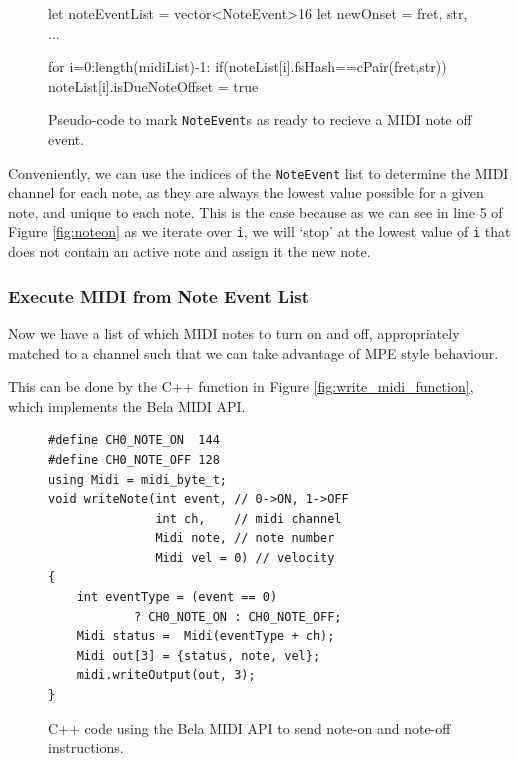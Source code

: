 \begin{figure}[h]
\begin{mdframed}
\begin{verbnobox}[\small]
let noteEventList = vector<NoteEvent>{16}
let newOnset = {fret, str, ...}

for i=0:length(midiList)-1:
{
    if(noteList[i].fsHash==cPair(fret,str))
    {
         noteList[i].isDueNoteOffset = true
    }
}
\end{verbnobox}
    \end{mdframed}
        \caption{Pseudo-code to mark \texttt{NoteEvent}s as ready to recieve a MIDI note off event.}
    \label{fig:noteoff}
\end{figure}

Conveniently, we can use the indices of the \texttt{NoteEvent} list to determine the MIDI channel for each note, as they are always the lowest value possible for a given note, and unique to each note. This is the case because as we can see in line 5 of Figure \ref{fig:noteon} as we iterate over \texttt{i}, we will `stop' at the lowest value of \texttt{i} that does not contain an active note and assign it the new note. 

\subsubsection{Execute MIDI from Note Event List}
Now we have a list of which MIDI notes to turn on and off, appropriately matched to a channel such that we can take advantage of MPE style behaviour.

This can be done by the C++ function in Figure \ref{fig:write_midi_function}, which implements the Bela MIDI API.

\begin{figure}[h]
\begin{mdframed}
\begin{lstlisting}
#define CH0_NOTE_ON  144
#define CH0_NOTE_OFF 128
using Midi = midi_byte_t;
void writeNote(int event, // 0->ON, 1->OFF
               int ch,    // midi channel
               Midi note, // note number
               Midi vel = 0) // velocity 
{
    int eventType = (event == 0)
            ? CH0_NOTE_ON : CH0_NOTE_OFF;
    Midi status =  Midi(eventType + ch);
    Midi out[3] = {status, note, vel};
    midi.writeOutput(out, 3);
}
\end{lstlisting}
\end{mdframed}
        \caption{C++ code using the Bela MIDI API to send note-on and note-off instructions.}
    \label{fig:noteoff}
\end{figure}

